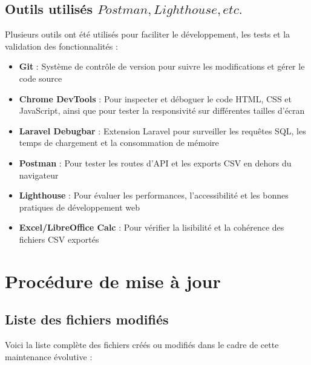 \documentclass[a4paper,12pt]{report}
\begin{document}
  \subsection{Outils utilisés \(Postman, Lighthouse, etc.\)}
  Plusieurs outils ont été utilisés pour faciliter le développement, les tests et la validation des fonctionnalités :
  
  \begin{itemize}
    \item \textbf{Git} : Système de contrôle de version pour suivre les modifications et gérer le code source
    
    \item \textbf{Chrome DevTools} : Pour inspecter et déboguer le code HTML, CSS et JavaScript, ainsi que pour tester la responsivité sur différentes tailles d'écran
    
    \item \textbf{Laravel Debugbar} : Extension Laravel pour surveiller les requêtes SQL, les temps de chargement et la consommation de mémoire
    
    \item \textbf{Postman} : Pour tester les routes d'API et les exports CSV en dehors du navigateur
    
    \item \textbf{Lighthouse} : Pour évaluer les performances, l'accessibilité et les bonnes pratiques de développement web
    
    \item \textbf{Excel/LibreOffice Calc} : Pour vérifier la lisibilité et la cohérence des fichiers CSV exportés

  \end{itemize}

\section{Procédure de mise à jour}
  \subsection{Liste des fichiers modifiés}
  Voici la liste complète des fichiers créés ou modifiés dans le cadre de cette maintenance évolutive :
  
\end{document}
